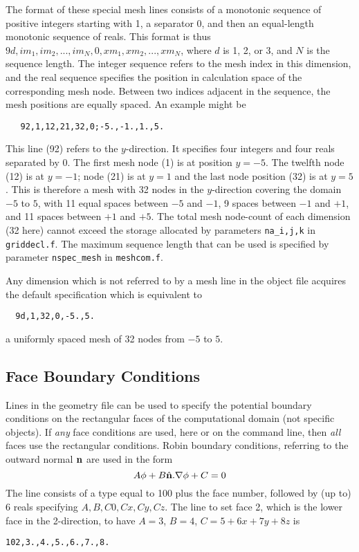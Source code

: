 \documentclass[12pt]{article}
\begin{document}
The format of these special mesh lines consists of a monotonic
sequence of positive integers starting with 1, a separator 0, and then
an equal-length monotonic sequence of reals. This format is thus
$9d,im_1,im_2,...,im_N,0,xm_1,xm_2,...,xm_N$, where $d$ is 1, 2, or 3,
and $N$ is the sequence length. The integer sequence refers to the
mesh index in this dimension, and the real sequence specifies the
position in calculation space of the corresponding mesh node. Between
two indices adjacent in the sequence, the mesh positions are equally
spaced. An example might be
\begin{verbatim}
   92,1,12,21,32,0;-5.,-1.,1.,5.
\end{verbatim}
This line (92) refers to the $y$-direction. It specifies four integers
and four reals separated by 0. The first mesh node (1) is at position
$y=-5$. The twelfth node (12) is at $y=-1$; node (21) is at $y=1$ and the
last node position (32) is at $y=5$. This is therefore a mesh with 32
nodes in the $y$-direction covering the domain $-5$ to $5$, with 11
equal spaces between $-5$ and $-1$, 9 spaces between $-1$ and $+1$,
and 11 spaces between $+1$ and $+5$. The total mesh node-count of each
dimension (32 here) cannot exceed the storage allocated by parameters
\verb!na_i,j,k! in \verb!griddecl.f!. The maximum sequence length that
can be used is specified by parameter \verb!nspec_mesh! in
\verb!meshcom.f!.

Any dimension which is not referred to by a mesh line in the object
file acquires the default specification which is equivalent to
\begin{verbatim}
  9d,1,32,0,-5.,5.
\end{verbatim}
a uniformly spaced mesh of 32 nodes from $-5$ to $5$.

\subsection{Face Boundary Conditions}

Lines in the geometry file can be used to specify the potential
boundary conditions on the rectangular faces of the computational
domain (not specific objects). If \emph{any} face conditions are used,
here or on the command line, then \emph{all} faces use the rectangular
conditions.  Robin boundary conditions, referring to the outward
normal ${\bf n}$ are used in the form
$$A\phi + B \hat{\bf n}.\nabla\phi + C =0$$
The line consists of a type equal to 100 plus the face number,
followed by (up to) 6 reals specifying $A,B,C0,Cx,Cy,Cz$.
The line to set face 2, which is the lower face in the 2-direction, to
have $A=3$, $B=4$, $C=5+6x+7y+8z$ is
\begin{verbatim}
102,3.,4.,5.,6.,7.,8.
\end{verbatim}
\end{document}
